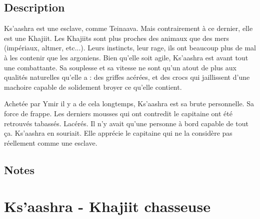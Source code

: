 \documentclass{Tamriel}
\begin{document}
\begin{multicols*}{2}
\raggedcolumns

        \section*{Description}
        
        Ks'aashra est une esclave, comme Teinaava. Mais contrairement à ce dernier, elle est une Khajiit. Les Khajiits sont plus proches des animaux que des mers (impériaux, altmer, etc...). Leurs instincts, leur rage, ils ont beaucoup plus de mal à les contenir que les argoniens. Bien qu'elle soit agile, Ks'aashra est avant tout une combattante. Sa souplesse et sa vitesse ne sont qu'un atout de plus aux qualités naturelles qu'elle a : des griffes acérées, et des crocs qui jaillissent d'une machoire capable de solidement broyer ce qu'elle contient.
        
        Achetée par Ymir il y a de cela longtemps, Ks'aashra est sa brute personnelle. Sa force de frappe. Les derniers mousses qui ont contredit le capitaine ont été retrouvés tabassés. Lacérés. Il n'y avait qu'une personne à bord capable de tout ça. Ks'aashra en souriait. Elle apprécie le capitaine qui ne la considère pas réellement comme une esclave.
        
        \columnbreak

        \section*{Notes}
        
\end{multicols*}

\chapter*{Ks'aashra - Khajiit chasseuse}
\end{document}
